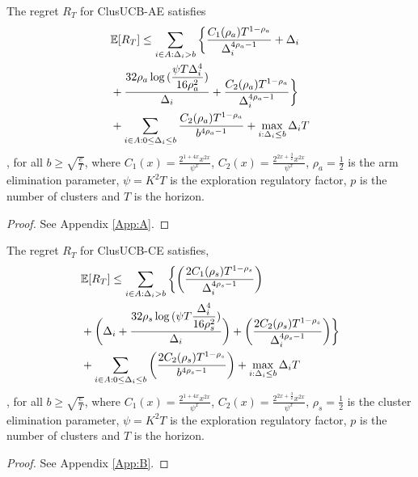 \begin{proposition}
\label{proofTheorem:Prop:1}
The regret $R_T$ for ClusUCB-AE satisfies
\begin{align*}
&\mathbb{E} [R_{T}]\leq \sum\limits_{i\in A:\Delta_{i} > b}\bigg\lbrace\frac{C_{1}(\rho_{a})T^{1-\rho_{a}}}{\Delta_{i}^{4\rho_{a}-1}} + \Delta_{i}\\
&+\frac{32\rho_{a}\log{(\dfrac{\psi  T\Delta_{i}^{4}}{16\rho_{a}^{2}})}}{\Delta_{i}}
 +  \frac{C_{2}(\rho_{a})T^{1-\rho_{a}}}{\Delta_{i}^{4\rho_{a} -1}}  \bigg \rbrace\\
&+\sum\limits_{i\in A:0\leq\Delta_{i}\leq b}\frac{C_{2}(\rho_{a})T^{1-\rho_{a}}}{b^{4\rho_{a} -1}}  + \max_{i:\Delta_{i}\leq b}\Delta_{i}T
\end{align*}
, for all $b\geq\sqrt{\frac{e}{T}}$, where  $C_1(x) = \frac{2^{1+4x}x^{2x}}{\psi^{x}}$,  $C_2(x) = \frac{2^{2x+\frac{3}{2}}x^{2x}}{\psi^{x}}$, $\rho_{a}=\frac{1}{2}$ is the arm elimination parameter, $\psi=K^{2}T$ is the exploration regulatory factor, $p$ is the number of clusters and $T$ is the horizon.
\end{proposition}
\begin{proof}
See Appendix \ref{App:A}.
\end{proof}

\begin{proposition}
\label{proofTheorem:Prop:2}
The regret $R_T$ for ClusUCB-CE satisfies,
\begin{align*}
&\mathbb{E} [R_{T}]\leq \sum\limits_{i\in A:\Delta_{i} > b}\bigg\lbrace\bigg(\dfrac{2C_{1}(\rho_{s})T^{1-\rho_{s}}}{\Delta_{i}^{4\rho_{s}-1}}\bigg)\\
& + \bigg(\Delta_{i}+\dfrac{32\rho_{s}\log{(\psi T\dfrac{\Delta_{i}^{4}}{16\rho_{s}^{2}})}}{\Delta_{i}}\bigg) + \bigg(\dfrac{2C_{2}(\rho_{s})T^{1-\rho_{s}}}{\Delta_{i}^{4\rho_{s} -1}} \bigg)\bigg\rbrace \\
& + \sum\limits_{i\in A:0\leq\Delta_{i}\leq b}\bigg(\dfrac{2C_{2}(\rho_{s})T^{1-\rho_{s}}}{b^{4\rho_{s} -1}} \bigg) + \max_{i:\Delta_{i}\leq b}\Delta_{i}T
\end{align*}
, for all $b\geq \sqrt{\frac{e}{T}}$, where $C_1(x) = \frac{2^{1+4x}x^{2x}}{\psi^{x}}$,  $C_2(x) = \frac{2^{2x+\frac{3}{2}}x^{2x}}{\psi^{x}}$, $\rho_{s}=\frac{1}{2} $ is the cluster elimination parameter, $\psi=K^{2}T$ is the exploration regulatory factor, $p$ is the number of clusters and $T$ is the horizon.
\end{proposition}
\begin{proof}
See Appendix \ref{App:B}.
\end{proof}